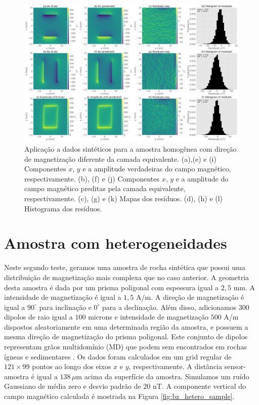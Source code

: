 \begin{figure}
	\centering
	\includegraphics[width=1.15\textwidth]{Fig/mag_vec/amostra_homo_errado/comparison_true_estimated.png}
	\caption{Aplicação a dados sintéticos para a amostra homogênea com direção de magnetização diferente da camada equivalente. (a),(e) e (i) Componentes $x$, $y$ e a amplitude verdadeiras do campo magnético, respectivamente. (b), (f) e (j) Componentes $x$, $y$ e a amplitude do campo magnético preditas pela camada equivalente, respectivamente. (c), (g) e (k) Mapas dos resíduos. (d), (h) e (l) Histograma dos resíduos.}
	\label{fig:comparison_homo_sample_difdir}
\end{figure}


\section{Amostra com heterogeneidades}
\label{sec:hetero_sample}

Neste segundo teste, geramos uma amostra de rocha sintética que possui uma distribuição de magnetização mais complexa que no caso anterior. A geometria desta amostra é dada por um prisma poligonal com espessura igual a $2,5$ mm. A intensidade de magnetização é igual a $1,5$ A/m. A direção de magnetização é igual a $90^\circ$ para inclinação e $0^\circ$ para a declinação. Além disso, adicionamos $300$ dipolos de raio igual a $100$ microns e intensidade de magnetização $500$ A/m dispostos aleatoriamente em uma determinada região da amostra, e possuem a mesma direção de magnetização do prisma poligonal. Este conjunto de dipolos representam grãos multidomínio (MD) que podem sem encontrados em rochas ígneas e sedimentares \citep{dunlop1997,butler1998,clark1997}. Os dados foram calculados em um grid regular de $121 \times 99$ pontos ao longo dos eixos $x$ e $y$, respectivamente. A distância sensor-amostra é igual a $138\, \mu $m acima da superfície da amostra. Simulamos um ruído Gaussiano de média zero e desvio padrão de $20$ nT. A componente vertical do campo magnético calculada é mostrada na Figura 
\ref{fig:bz_hetero_sample}.

